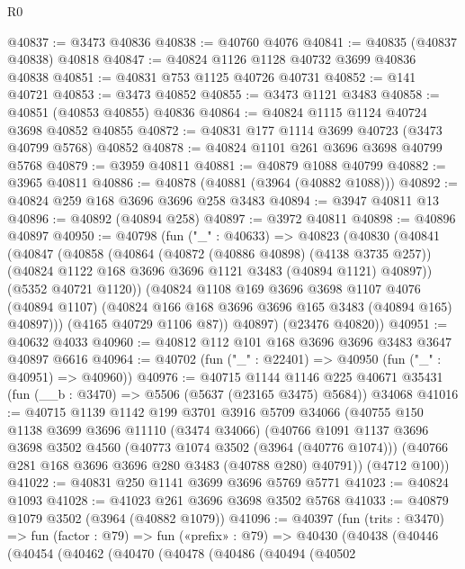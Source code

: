 \begin{lexlean}{R0}
\begin{coremodule}
@40837 := @3473 @40836
@40838 := @40760 @4076
@40841 := @40835 (@40837 @40838) @40818
@40847 := @40824 @1126 @1128 @40732 @3699 @40836 @40838
@40851 := @40831 @753 @1125 @40726 @40731
@40852 := @141 @40721
@40853 := @3473 @40852
@40855 := @3473 @1121 @3483
@40858 := @40851 (@40853 @40855) @40836
@40864 := @40824 @1115 @1124 @40724 @3698 @40852 @40855
@40872 := @40831 @177 @1114 @3699 @40723 (@3473 @40799 @5768) @40852
@40878 := @40824 @1101 @261 @3696 @3698 @40799 @5768
@40879 := @3959 @40811
@40881 := @40879 @1088 @40799
@40882 := @3965 @40811
@40886 := @40878 (@40881 (@3964 (@40882 @1088)))
@40892 := @40824 @259 @168 @3696 @3696 @258 @3483
@40894 := @3947 @40811 @13
@40896 := @40892 (@40894 @258)
@40897 := @3972 @40811
@40898 := @40896 @40897
@40950 := @40798
    (fun ("_" : @40633) =>
    @40823
      (@40830
        (@40841
          (@40847
            (@40858
              (@40864
                (@40872 (@40886 @40898) (@4138 @3735 @257))
                (@40824 @1122 @168 @3696 @3696 @1121 @3483 (@40894 @1121) @40897))
              (@5352 @40721 @1120))
            (@40824
              @1108
              @169
              @3696
              @3698
              @1107
              @4076
              (@40894 @1107)
              (@40824 @166 @168 @3696 @3696 @165 @3483 (@40894 @165) @40897)))
          (@4165 @40729 @1106 @87))
        @40897)
      (@23476 @40820))
@40951 := @40632 @4033
@40960 := @40812 @112 @101 @168 @3696 @3696 @3483 @3647 @40897 @6616
@40964 := @40702 (fun ("_" : @22401) => @40950 (fun ("_" : @40951) => @40960))
@40976 := @40715
    @1144
    @1146
    @225
    @40671
    @35431
    (fun (__b : @3470) => @5506 (@5637 (@23165 @3475) @5684))
    @34068
@41016 := @40715
    @1139
    @1142
    @199
    @3701
    @3916
    @5709
    @34066
    (@40755
      @150
      @1138
      @3699
      @3696
      @11110
      (@3474 @34066)
      (@40766
        @1091
        @1137
        @3696
        @3698
        @3502
        @4560
        (@40773 @1074 @3502 (@3964 (@40776 @1074)))
        (@40766 @281 @168 @3696 @3696 @280 @3483 (@40788 @280) @40791))
      (@4712 @100))
@41022 := @40831 @250 @1141 @3699 @3696 @5769 @5771
@41023 := @40824 @1093
@41028 := @41023 @261 @3696 @3698 @3502 @5768
@41033 := @40879 @1079 @3502 (@3964 (@40882 @1079))
@41096 := @40397
    (fun (trits : @3470) =>
    fun (factor : @79) =>
    fun («prefix» : @79) =>
    @40430
      (@40438
        (@40446
          (@40454
            (@40462
              (@40470
                (@40478
                  (@40486
                    (@40494
                      (@40502

\end{coremodule}
\end{lexlean}
